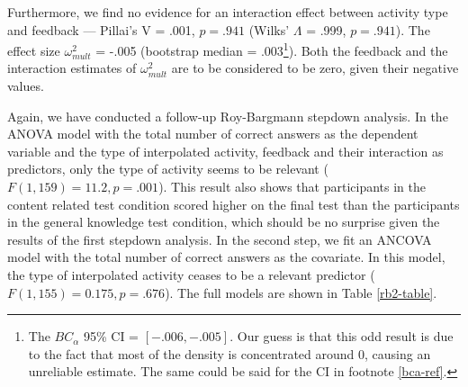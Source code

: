 \documentclass[../main.tex]{subfiles}
\begin{document}
Furthermore, we find no evidence for an interaction effect between
activity type and feedback --- Pillai's V = .001, \(p = .941\) (Wilks'
\(\Lambda\) = .999, \(p = .941\)). The effect size \(\omega^2_{mult}\) =
-.005 (bootstrap median = .003\footnote{
The \(BC_\alpha\) 95\% CI = \([-.006,
-.005]\).
Our guess is that this odd result is due to the fact that most of the density is concentrated
around 0, causing an unreliable estimate. The same could be said for the CI in
footnote \ref{bca-ref}.}). Both the feedback and the interaction
estimates of \(\omega^2_{mult}\) are to be considered to be zero, given
their negative values.

Again, we have conducted a follow-up Roy-Bargmann stepdown analysis. In
the ANOVA model with the total number of correct answers as the
dependent variable and the type of interpolated activity, feedback and
their interaction as predictors, only the type of activity seems to be
relevant (\(F(1, 159) = 11.2, p = .001\)). This result also shows that
participants in the content related test condition scored higher on the
final test than the participants in the general knowledge test
condition, which should be no surprise given the results of the first
stepdown analysis. In the second step, we fit an ANCOVA model with the
total number of correct answers as the covariate. In this model, the
type of interpolated activity ceases to be a relevant predictor
(\(F(1, 155) = 0.175, p = .676\)). The full models are shown in Table
\ref{rb2-table}.
\end{document}
